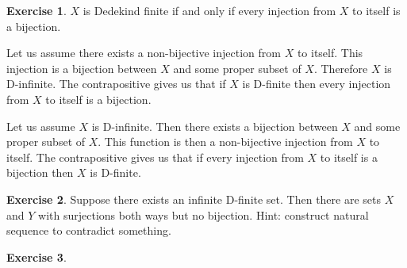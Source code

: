 \documentclass{article}
\theoremstyle{definition}
\newtheorem{exer}{Exercise}[section]
\newlength{\defparindent}
\newenvironment{answer}
    {\begin{mdframed}[backgroundcolor=gray!15, linewidth=0pt] \setlength{\parindent}{\defparindent}}
    {\end{mdframed}}
\begin{document}
\begin{exer}
    $X$ is Dedekind finite if and only if every injection from $X$ to itself is a bijection.
    \begin{answer}
        Let us assume there exists a  non-bijective injection from $X$ to itself. This injection is a bijection between $X$ and some proper subset of $X$. Therefore $X$ is D-infinite. The contrapositive gives us that if $X$ is D-finite then every injection from $X$ to itself is a bijection.

        Let us assume $X$ is D-infinite. Then there exists a bijection between $X$ and some proper subset of $X$. This function is then a non-bijective injection from $X$ to itself. The contrapositive gives us that if every injection from $X$ to itself is a bijection then $X$ is D-finite.
    \end{answer}
\end{exer}

\begin{exer}
    Suppose there exists an infinite D-finite set. Then there are sets $X$ and $Y$ with surjections both ways but no bijection. Hint: construct natural sequence to contradict something.
\end{exer}

\begin{exer}
    
\end{exer}
\end{document}
